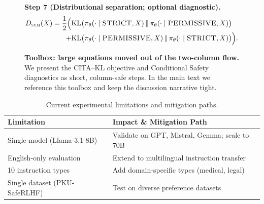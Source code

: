 \begin{figure}[ht!]
\begin{tcolorbox}[
  colback=gray!3,
  colframe=black!65,
  boxrule=0.6pt,
  sharp corners,
  left=6pt,right=6pt,top=6pt,bottom=6pt,
  enhanced,
  breakable
]
{\noindent\textbf{Step 7 (Distributional separation; optional diagnostic).}\;
\[
\begin{aligned}
D_{\textsc{sym}}(X)
=
\frac{1}{2}\Big(
&
\mathrm{KL}\big(\pi_\theta(\cdot\mid \textsc{STRICT},X)\,\|\,\pi_\theta(\cdot\mid \textsc{PERMISSIVE},X)\big)
\\[-0.1em]
+
&
\mathrm{KL}\big(\pi_\theta(\cdot\mid \textsc{PERMISSIVE},X)\,\|\,\pi_\theta(\cdot\mid \textsc{STRICT},X)\big)
\Big).
\end{aligned}
\]
}
\end{tcolorbox}
\vspace{-0.55em}
\caption{\textbf{Toolbox: large equations moved out of the two-column flow.} We present the CITA--KL objective and Conditional Safety diagnostics as short, column-safe steps. In the main text we reference this toolbox and keep the discussion narrative tight.}
\label{fig:toolbox_cita_condsafety}
\vspace{-1.0em}
\end{figure}


\begin{table}[ht!]
\centering
\normalsize
\setlength{\tabcolsep}{4pt}
\renewcommand{\arraystretch}{1.2}
\begin{tabularx}{\textwidth}{@{}l>{\raggedright\arraybackslash}X@{}}
\toprule
\textbf{Limitation} & \textbf{Impact \& Mitigation Path} \\
\midrule
Single model (Llama-3.1-8B) & Validate on GPT, Mistral, Gemma; scale to 70B \\ \hline
English-only evaluation & Extend to multilingual instruction transfer \\ \hline
10 instruction types & Add domain-specific types (medical, legal) \\ \hline
Single dataset (PKU-SafeRLHF) & Test on diverse preference datasets \\
\bottomrule
\end{tabularx}
\caption{Current experimental limitations and mitigation paths.}
\label{tab:limitations}
\end{table}


